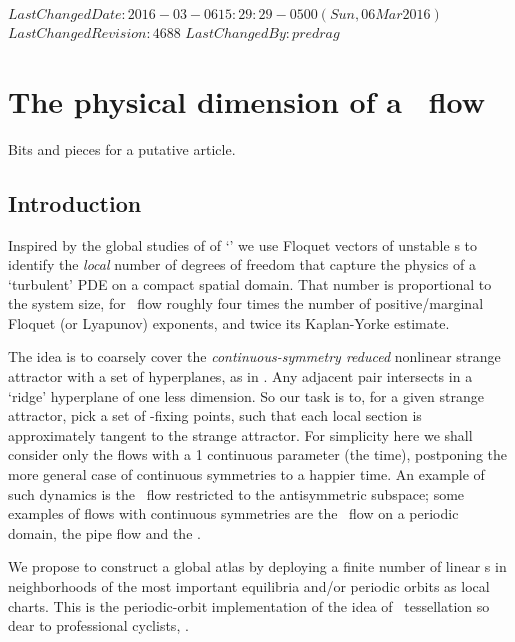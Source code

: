 \ifsvnmulti
 {$LastChangedDate: 2016-03-06 15:29:29 -0500 (Sun, 06 Mar 2016) $}
 {$LastChangedRevision: 4688 $} {$LastChangedBy: predrag $}
\fi

\chapter{The physical dimension of a \KS\ flow}
    \label{c-draft}

Bits and pieces for a putative article.

\section{Introduction}
\label{sect:intro}

Inspired by the global
studies of  of
`{\cLvs}' we use Floquet vectors of unstable \po s to
identify the \emph{local} number of degrees of freedom that capture the
physics of a `turbulent' PDE on a compact spatial domain. That number is
proportional to the system size, for \KS\ flow roughly four times the
number of positive/marginal Floquet (or Lyapunov) exponents, and twice its
Kaplan-Yorke estimate.

The idea is to coarsely cover the \emph{continuous-symmetry reduced}
nonlinear strange attractor with a set of hyperplanes,
as in . Any adjacent pair intersects in a `ridge'
hyperplane of one less dimension. So our task is to, for a given strange
attractor, pick a set of {\PoincSec}-fixing points, such that each local
section is approximately tangent to the strange attractor. For simplicity
here we shall consider only the flows with a 1 continuous parameter (the
time), postponing the more general case of continuous symmetries to a
happier time. An example of such dynamics is the \KS\ flow restricted to
the antisymmetric subspace; some examples of
flows with continuous symmetries are the \KS\ flow on a periodic
domain, the pipe flow and the \pCf{}.

We propose to construct a global atlas by deploying a finite
number of linear {\PoincSec s} in
neighborhoods of the most important equilibria and/or periodic orbits
as local charts.
This is the periodic-orbit implementation of the idea of {\statesp\
tessellation} so dear to professional cyclists, .

